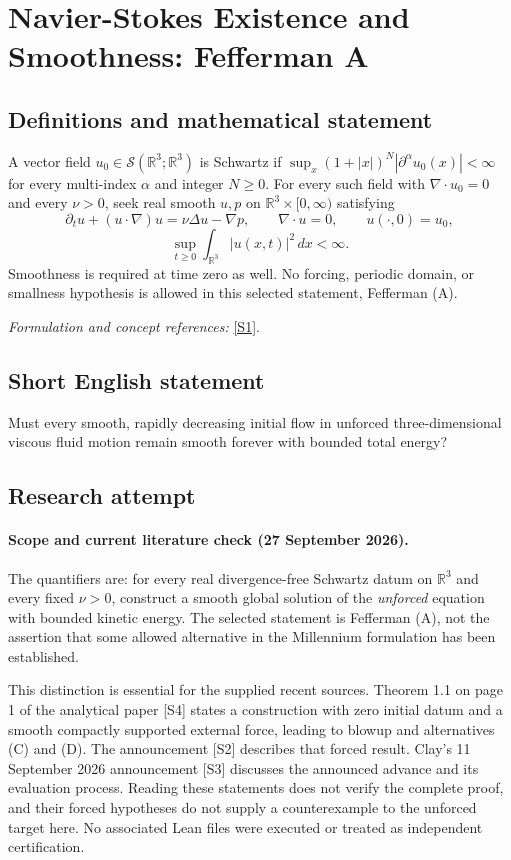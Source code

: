 \documentclass[11pt]{article}
\begin{document}
\section*{\texorpdfstring{Navier-Stokes Existence and Smoothness: Fefferman A}{Navier-Stokes Existence and Smoothness: Fefferman A}}\label{30006674}
\subsection{Definitions and mathematical statement}
A vector field $u_0\in\mathcal S({\mathbb{R}}^3;{\mathbb{R}}^3)$ is Schwartz if $\sup_x(1+|x|)^N|\partial^\alpha u_0(x)|<\infty$ for every multi-index $\alpha$ and integer $N\ge0$. For every such field with $\nabla\cdot u_0=0$ and every $\nu>0$, seek real smooth $u,p$ on ${\mathbb{R}}^3\times[0,\infty)$ satisfying
\[
 \partial_tu+(u\cdot\nabla)u=\nu\Delta u-\nabla p,\qquad
 \nabla\cdot u=0,\qquad u(\cdot,0)=u_0,
\]
\[
 \sup_{t\ge0}\int_{{\mathbb{R}}^3}|u(x,t)|^2\,dx<\infty.
\]
Smoothness is required at time zero as well. No forcing, periodic domain, or smallness hypothesis is allowed in this selected statement, Fefferman (A).
\par\smallskip\textit{Formulation and concept references:} \href{https://www.claymath.org/wp-content/uploads/2022/06/navierstokes.pdf}{[S1]}.

\subsection{Short English statement}
Must every smooth, rapidly decreasing initial flow in unforced three-dimensional viscous fluid motion remain smooth forever with bounded total energy?
\subsection{Research attempt}

\paragraph{Scope and current literature check (27 September 2026).}
The quantifiers are: for every real divergence-free Schwartz datum on
 $\mathbb R^3$ and every fixed $\nu>0$, construct a smooth global solution
 of the \emph{unforced} equation with bounded kinetic energy. The selected
 statement is Fefferman (A), not the assertion that some allowed alternative
 in the Millennium formulation has been established.

This distinction is essential for the supplied recent sources. Theorem 1.1
 on page 1 of the analytical paper [S4] states a construction with zero
 initial datum and a smooth compactly supported external force, leading to
 blowup and alternatives (C) and (D). The announcement [S2] describes that
 forced result. Clay's 11 September 2026 announcement [S3] discusses the
 announced advance and its evaluation process. Reading these statements
 does not verify the complete proof, and their forced hypotheses do not
 supply a counterexample to the unforced target here. No associated Lean
 files were executed or treated as independent certification.
\end{document}

